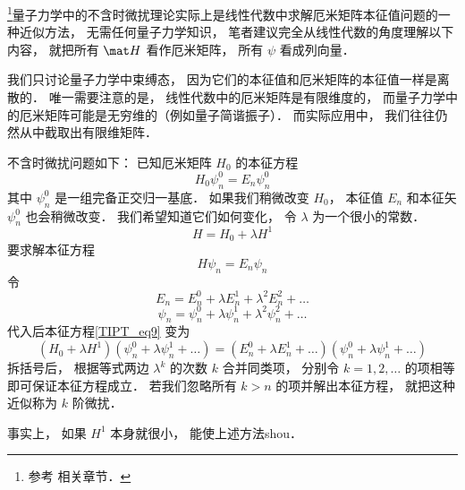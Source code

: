 

\footnote{参考 \cite{GriffQ} \cite{Shankar} \cite{Sakurai} \cite{Merzbacher} 相关章节．}量子力学中的不含时微扰理论实际上是线性代数中求解厄米矩阵本征值问题的一种近似方法， 无需任何量子力学知识， 笔者建议完全从线性代数的角度理解以下内容， 就把所有 $\mat H$ 看作厄米矩阵， 所有 $\psi$ 看成列向量．

我们只讨论量子力学中束缚态， 因为它们的本征值和厄米矩阵的本征值一样是离散的． 唯一需要注意的是， 线性代数中的厄米矩阵是有限维度的， 而量子力学中的厄米矩阵可能是无穷维的（例如量子简谐振子）． 而实际应用中， 我们往往仍然从中截取出有限维矩阵．

不含时微扰问题如下： 已知厄米矩阵 $H_0$ 的本征方程
\begin{equation}
H_0 \psi_n^0 = E_n \psi_n^0
\end{equation}
其中 $\psi_n^0$ 是一组完备正交归一基底． 如果我们稍微改变 $H_0$， 本征值 $E_n$ 和本征矢 $\psi_n^0$ 也会稍微改变． 我们希望知道它们如何变化， 令 $\lambda$ 为一个很小的常数．
\begin{equation}\label{TIPT_eq3}
H = H_0 + \lambda H^1
\end{equation}
要求解本征方程
\begin{equation}\label{TIPT_eq9}
H \psi_n = E_n \psi_n
\end{equation}
令
\begin{equation}
E_n = E_n^0 + \lambda E_n^1 + \lambda^2 E_n^2 + \dots
\end{equation}
\begin{equation}
\psi_n = \psi_n^0 + \lambda\psi_n^1 + \lambda^2 \psi_n^2 + \dots
\end{equation}
代入后本征方程\autoref{TIPT_eq9} 变为
\begin{equation}
(H_0 + \lambda H^1)(\psi_n^0 + \lambda\psi_n^1 + \dots) = (E_n^0 + \lambda E_n^1 + \dots)(\psi_n^0 + \lambda\psi_n^1 + \dots)
\end{equation}
拆括号后， 根据等式两边 $\lambda^k$ 的次数 $k$ 合并同类项， 分别令 $k=1,2,\dots$ 的项相等即可保证本征方程成立． 若我们忽略所有 $k > n$ 的项并解出本征方程， 就把这种近似称为 $k$ 阶微扰．

事实上， 如果 $H^1$ 本身就很小， 能使上述方法shou．

